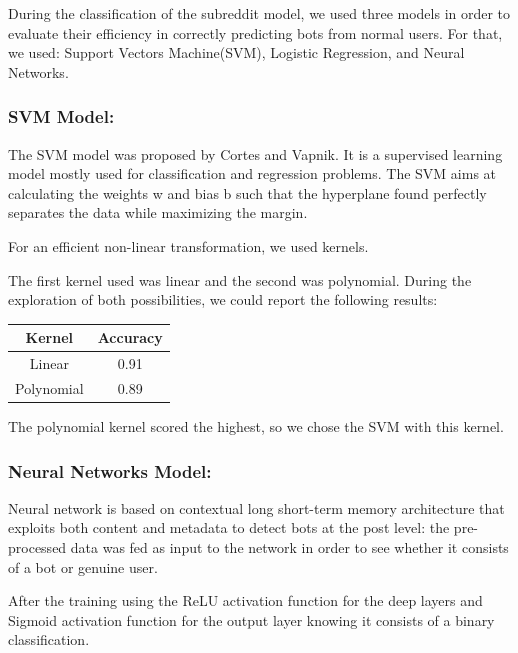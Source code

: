 \documentclass{article}
\begin{document}
    
    During the classification of  the subreddit model, we used three models in order to evaluate their efficiency in correctly predicting bots from normal users. For that, we used: Support Vectors Machine(SVM), Logistic Regression, and Neural Networks.
    
    \subsubsection{SVM Model:}
    
    The SVM model was proposed by Cortes and Vapnik. It is a supervised learning model mostly used for classification and regression problems. The SVM aims at calculating the weights w and bias b such that the hyperplane found perfectly separates the data while maximizing the margin.
    
    For an efficient non-linear transformation, we used kernels.
    
    The first kernel used was linear and the second was polynomial. During the exploration of both possibilities, we could report the following results:
    
    \begin{center}
    \begin{tabular}{||c c||} 
     \hline
     Kernel & Accuracy    \\ [0.5ex] 
     \hline\hline
     Linear & 0.91  \\ 
     \hline
     Polynomial & 0.89  \\
     \hline
    \end{tabular}
    \end{center}
    
    The polynomial kernel scored the highest, so we chose the SVM with this kernel.
       

    \subsubsection{Neural Networks Model:}
    
    Neural network is based on contextual long short-term memory architecture that exploits both content and metadata to detect bots at the post level: the pre-processed data was fed as  input to the network in order to see whether it consists of a bot or genuine user. 
    
    After the training using the ReLU activation function for the deep layers and Sigmoid activation function for the output layer knowing it consists of a binary classification.
    
\end{document}
